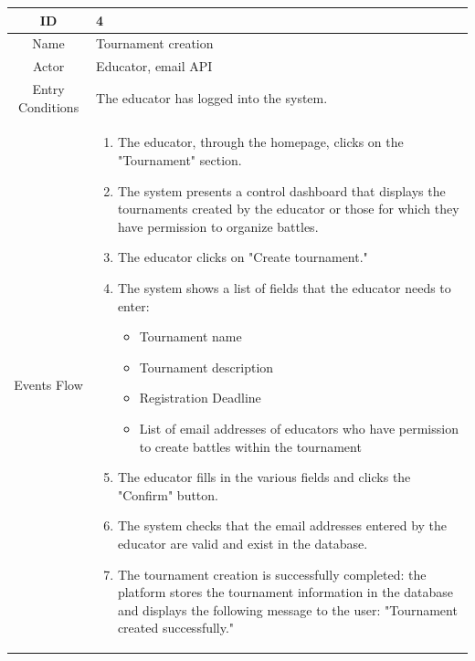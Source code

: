 \begin{longtable}{|c| p{10cm}|}
        \hline
            ID & 4 \\
        \hline
            Name & Tournament creation \\
        \hline
            Actor & Educator, email API \\
        \hline
            Entry Conditions & 
                                The educator has logged into the system.
                                \\
        \hline
            Events Flow &   \begin{enumerate}
                                \item The educator, through the homepage, clicks on the "Tournament" section.
                                \item The system presents a control dashboard that displays the tournaments created by the educator or those for which they have permission to organize battles.
                                \item The educator clicks on "Create tournament."
                                \item The system shows a list of fields that the educator needs to enter:
                                \begin{itemize}
                                    \item Tournament name
                                    \item Tournament description
                                    \item Registration Deadline
                                    \item List of email addresses of educators who have permission to create battles within the tournament
                                \end{itemize}
                                \item The educator fills in the various fields and clicks the "Confirm" button.
                                \item The system checks that the email addresses entered by the educator are valid and exist in the database.
                                \item The tournament creation is successfully completed: the platform stores the tournament information in the database and displays the following message to the user: "Tournament created successfully."
                            \end{enumerate} \\

\end{longtable}

